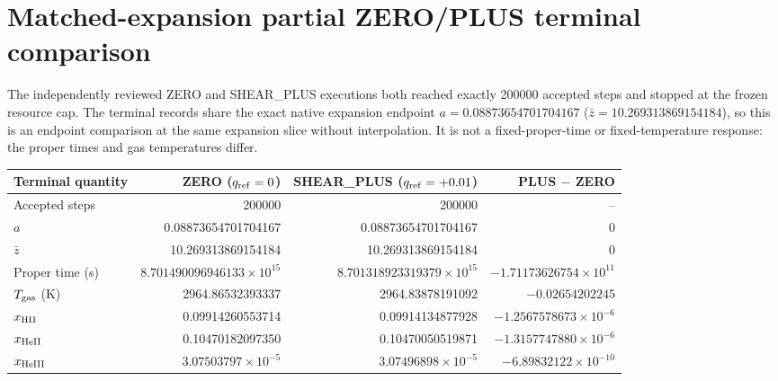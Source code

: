 \documentclass[11pt]{article}
\begin{document}
\section{Matched-expansion partial ZERO/PLUS terminal comparison}
The independently reviewed ZERO and SHEAR\_PLUS executions both reached exactly 200000 accepted steps and stopped at the frozen resource cap. The terminal records share the exact native expansion endpoint $a=0.08873654701704167$ ($\bar z=10.269313869154184$), so this is an endpoint comparison at the same expansion slice without interpolation. It is not a fixed-proper-time or fixed-temperature response: the proper times and gas temperatures differ.

\begin{center}
\begin{tabular}{lrrr}\toprule
Terminal quantity & ZERO ($q_{\rm ref}=0$) & SHEAR\_PLUS ($q_{\rm ref}=+0.01$) & PLUS $-$ ZERO\\\midrule
Accepted steps & 200000 & 200000 & --\\
$a$ & 0.08873654701704167 & 0.08873654701704167 & 0\\
$\bar z$ & 10.269313869154184 & 10.269313869154184 & 0\\
Proper time (s) & $8.701490096946133\times10^{15}$ & $8.701318923319379\times10^{15}$ & $-1.71173626754\times10^{11}$\\
$T_{\rm gas}$ (K) & 2964.86532393337 & 2964.83878191092 & $-0.02654202245$\\
$x_{\rm HII}$ & 0.09914260553714 & 0.09914134877928 & $-1.2567578673\times10^{-6}$\\
$x_{\rm HeII}$ & 0.10470182097350 & 0.10470050519871 & $-1.3157747880\times10^{-6}$\\
$x_{\rm HeIII}$ & $3.07503797\times10^{-5}$ & $3.07496898\times10^{-5}$ & $-6.89832122\times10^{-10}$\\
\bottomrule
\end{tabular}
\end{center}
\end{document}
